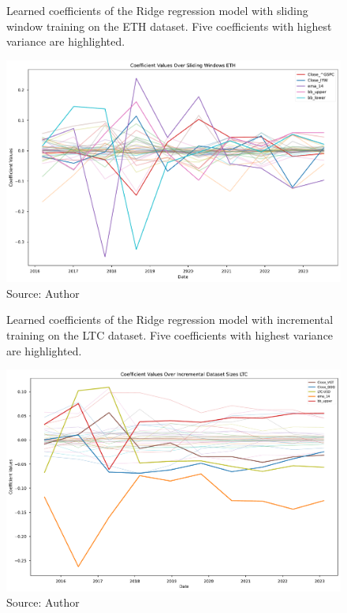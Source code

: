 \begin{figure}[!h]
    \centering
    \caption{Learned coefficients of the Ridge regression model
    with sliding window training on the ETH dataset. Five 
    coefficients with highest variance are highlighted.}
    \includegraphics[width=1\textwidth]{Figures/coefficient_values_sliding_eth.pdf}
    \caption*{Source: Author}
    \label{fig:coefs_sliding_eth}
\end{figure}

\begin{figure}[!h]
    \centering
    \caption{Learned coefficients of the Ridge regression model
    with incremental training on the LTC dataset. Five 
    coefficients with highest variance are highlighted.}
    \includegraphics[width=1\textwidth]{Figures/coefficient_values_incremental_ltc.pdf}
    \caption*{Source: Author}
    \label{fig:coefs_incremental_ltc}
\end{figure}

